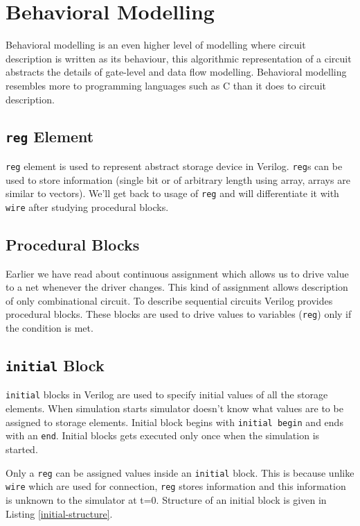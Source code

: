 \documentclass[a4paper,10pt]{article}
\theoremstyle{mytheor}
\newcounter{pitfallCount} %
\newcommand{\pitfallcounter}[1]{%
  \refstepcounter{pitfallCount}%
  \thepitfallCount%
  \label{#1}}%
\newcommand{\pitfall}[2] {
  \begin{tcolorbox}[arc=0pt,colback=yellow!10!white,colframe=orange!75!black,title=\textbf{Common Pitfall - \pitfallcounter{#1}}]
    #2
  \end{tcolorbox}
}
\newcommand{\inlinev}[1]{\lstinline[style=verilog-inline-style]{#1}}
\begin{document}
\section{Behavioral Modelling}
Behavioral modelling is an even higher level of modelling where
circuit description is written as its behaviour, this algorithmic
representation of a circuit abstracts the details of gate-level and
data flow modelling. Behavioral modelling resembles more to
programming languages such as C than it does to circuit description.


\subsection{\inlinev{reg} Element}
\inlinev{reg} element is used to represent abstract storage device in
Verilog. \inlinev{reg}s can be used to store information (single bit
or of arbitrary length using array, arrays are similar to
vectors). We'll get back to usage of \inlinev{reg} and will
differentiate it with \inlinev{wire} after studying procedural blocks.

\subsection{Procedural Blocks}
Earlier we have read about continuous assignment which allows us to
drive value to a net whenever the driver changes. This kind of
assignment allows description of only combinational circuit. To
describe sequential circuits Verilog provides procedural blocks. These
blocks are used to drive values to variables (\inlinev{reg}) only if
the condition is met.

\subsection{\inlinev{initial} Block}
\inlinev{initial} blocks in Verilog are used to specify initial values
of all the storage elements. When simulation starts simulator doesn't
know what values are to be assigned to storage elements. Initial block
begins with \inlinev{initial begin} and ends with an
\inlinev{end}. Initial blocks gets executed only once when the
simulation is started.

\pitfall{pitfall:reg-vs-wire}{Only a \inlinev{reg} can be assigned values inside an
  \inlinev{initial} block. This is because unlike \inlinev{wire} which
  are used for connection, \inlinev{reg} stores information and this
  information is unknown to the simulator at t=0. Structure of an
  initial block is given in Listing \ref{initial-structure}.}
\end{document}
